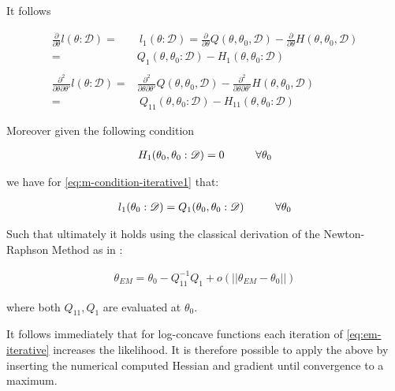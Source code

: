 \documentclass[11pt]{article}
\begin{document}
\begin{article}
It follows

\begin{align} 
\frac{\partial}{\partial \theta} l (\theta: \mathscr{D}) =& \ l_1 (\theta: \mathscr{D}) = \frac{\partial}{\partial \theta} Q(\theta, \theta_0, \mathscr{D}) - \frac{\partial}{\partial \theta} H(\theta, \theta_0, \mathscr{D}) \nonumber \\
=& Q_1(\theta, \theta_0 : \mathscr{D}) - H_1(\theta, \theta_0 : \mathscr{D})  \label{eq:m-condition-iterative1} \\
\nonumber \\
\frac{\partial^2}{\partial \theta \partial \theta'} l (\theta: \mathscr{D}) =& \frac{\partial^2}{\partial \theta \partial \theta'}  Q(\theta, \theta_0, \mathscr{D}) -  \frac{\partial^2}{\partial \theta \partial \theta'}  H(\theta, \theta_0, \mathscr{D}) \nonumber \\
  =& \ Q_{11}(\theta, \theta_0 : \mathscr{D}) - H_{11}(\theta, \theta_0 : \mathscr{D}) \label{eq:m-condition-iterative2}
\end{align}

Moreover given the following condition

\begin{align} 
 H_1(\theta_0, \theta_0 : \mathscr{D})  = 0 \hspace*{1cm} \forall \theta_0 \label{eq:m-condition-entropy-iterative}
\end{align}

we have for \ref{eq:m-condition-iterative1} that:

\begin{align} 
 l_1(\theta_0: \mathscr{D})  = Q_1(\theta_0, \theta_0: \mathscr{D}) \hspace*{1cm} \forall \theta_0 \label{eq:m-condition-entropy-iterative2} 
\end{align}

Such that ultimately it holds using the classical derivation of the
Newton-Raphson Method as in \cite{storvik2007numerical}:


\begin{align} 
 \theta_{EM}  = \theta_{0} - Q_{11}^{-1} Q_1 + o(||\theta_{EM} - \theta_{0}||) \label{eq:em-iterative}
\end{align}

where both \(Q_{11}, Q_{1}\) are evaluated at \(\theta_0\).

It follows immediately that for log-concave functions each iteration
of \ref{eq:em-iterative} increases the likelihood. It is therefore
possible to apply the above by inserting the numerical computed
Hessian and gradient until convergence to a maximum.


\end{article}
\end{document}
